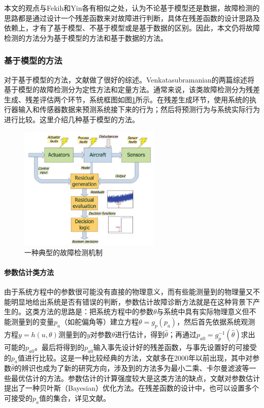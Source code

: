 \documentclass{article}
\begin{document}
本文的观点与Fekih\cite{6859271}和Yin\cite{7407616}各有相似之处，认为不论基于模型还是数据，故障检测的思路都是通过设计一个残差函数来对故障进行判断，具体在残差函数的设计思路及依赖上，才有了基于模型、不基于模型或是基于数据的区别。因此，本文仍将故障检测的方法分为基于模型的方法和基于数据的方法。

\subsubsection{基于模型的方法}\label{subsubsec:modelbased}
对于基于模型的方法，文献\cite{Marzat2012modelbased}做了很好的综述。Venkatasubramanian的两篇综述\cite{Venkatasubramanian2003293,Venkatasubramanian2003A}将基于模型的故障检测分为定性方法和定量方法。通常来说，该类故障检测分为残差生成、残差评估两个环节\cite{Marzat2012modelbased}，系统框图如图\ref{fig:FDDProcess}所示。在残差生成环节，使用系统的执行器输入和传感器数据来预测系统接下来的行为；然后将预测行为与系统实际行为进行比较。这里介绍几种基于模型的方法。
\begin{figure}[htp]
    \centering
    \includegraphics[width = 0.6\textwidth]{FDDProcess.png}
    \caption{一种典型的故障检测机制}
    \label{fig:FDDProcess}
\end{figure}
\paragraph{参数估计类方法}由于系统方程中的参数很可能没有直接的物理意义，而有些能测量到的物理量又不能明显地给出系统是否有错误的判断，参数估计故障诊断方法就是在这种背景下产生的。这类方法的思路是：把系统方程中的参数$\theta$与系统中具有实际物理意义但不能测量到的变量$p_a$（如舵偏角等）建立方程$\theta = g_p(p_a)$，然后首先依据系统观测方程$y=h(u,\theta)$测量到的$y$对参数$\theta$进行估计，得到$\hat{\theta}$；再通过$p_{a0} = g_p^{-1}(\hat{\theta})$求出可能的$p_{a0}$。最后将得到的$p_{a0}$输入事先设计好的残差函数，与事先设置好的可接受的$p_a$值进行比较。这是一种比较经典的方法，文献多在2000年以前出现\cite{ISERMANN1984387,FRANK1990459,ISERMANN1993815,411478,BLOCH19951709}，其中对参数$\hat{\theta}$的辨识也成为了新的研究方向\cite{ISERMANN1993815,411478,BLOCH19951709}，涉及到的方法多为最小二乘、卡尔曼滤波等一些最优估计的方法。参数估计的计算强度较大是这类方法的缺点，文献\cite{Villemonteix2009Bayesian}对参数估计提出了一种贝叶斯（Bayesian）优化方法。在残差函数的设计中，也可以设置多个可接受的$p_a$值的集合，详见文献\cite{Kieffer2011Guaranteed,Puig2010Fault}。
\end{document}
